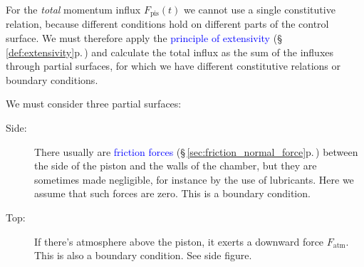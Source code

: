 \documentclass[a4paper,12pt,%
onecolumn,oneside,%
british%
]{memoir}
\renewcommand*{\|}[1][]{\nonscript\:#1\vert\nonscript\:\mathopen{}}
\newcommand*{\sect}{\S}%
\renewcommand*{\autoref}[3][\sect\,\ref]{\textcolor{blue}{#3} {\color{blue}\scriptsize(\faIcon[regular]{eye}\;#1{#2}\;p.\,\pageref{#2})}}
\newcommand*{\yFpi}{F_{\textrm{pis}}}
\newcommand*{\yFatm}{F_{\textrm{atm}}}
\begin{document}
\medskip

For the \emph{total} momentum influx $\yFpi(t)$ we cannot use a single constitutive relation, because different conditions hold on different parts of the control surface.
We must therefore apply the \autoref{def:extensivity}{principle of extensivity}
and calculate the total influx as the sum of the influxes through partial surfaces, for which we have different constitutive relations or boundary conditions.

We must consider three partial surfaces:
\begin{description}
\item[Side:] There usually are \autoref{sec:friction_normal_force}{friction forces} between the side of the piston and the walls of the chamber, but they are sometimes made negligible, for instance by the use of lubricants. Here we assume that such forces are zero. This is a boundary condition.

\item[Top:] If there's atmosphere above the piston, it exerts a downward force $\yFatm$. %
This is also a boundary condition. See side figure.

% 
%


\end{description}
\end{document}
